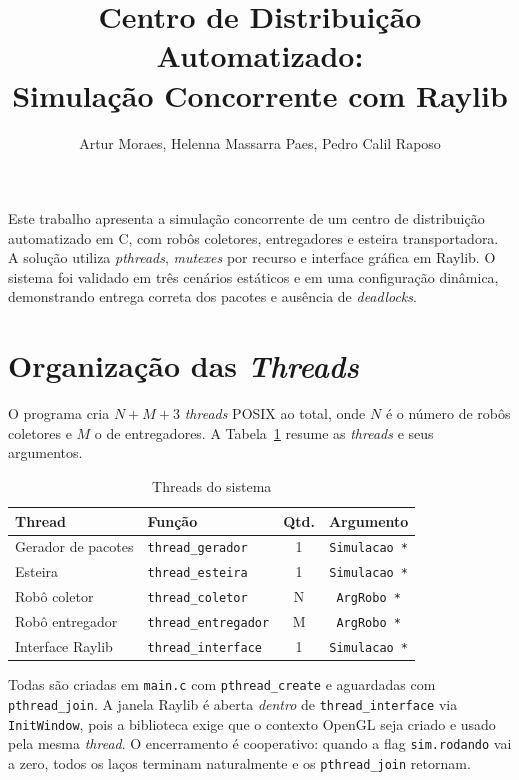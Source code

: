 \documentclass[12pt]{article}
\title{Centro de Distribuição Automatizado:\\
       Simulação Concorrente com Raylib}
\author{Artur Moraes, Helenna Massarra Paes, Pedro Calil Raposo}
\begin{document}
\maketitle

\begin{resumo}
Este trabalho apresenta a simulação concorrente de um centro de distribuição
automatizado em C, com robôs coletores, entregadores e esteira transportadora.
A solução utiliza \textit{pthreads}, \textit{mutexes} por recurso e interface
gráfica em Raylib. O sistema foi validado em três cenários estáticos e em uma
configuração dinâmica, demonstrando entrega correta dos pacotes e ausência de
\textit{deadlocks}.
\end{resumo}

\section{Organização das \textit{Threads}}
\label{sec:threads}

O programa cria $N + M + 3$ \textit{threads} POSIX \cite{posix:18} ao total,
onde $N$ é o número de robôs coletores e $M$ o de entregadores.  A Tabela~\ref{tab:threads} resume as
\textit{threads} e seus argumentos.

\begin{table}[h]
\centering
\caption{Threads do sistema}
\label{tab:threads}
\small
\begin{tabular}{llcc}
\toprule
\textbf{Thread}       & \textbf{Função}       & \textbf{Qtd.} & \textbf{Argumento}         \\
\midrule
Gerador de pacotes    & \texttt{thread\_gerador}    & 1 & \texttt{Simulacao *}       \\
Esteira               & \texttt{thread\_esteira}    & 1 & \texttt{Simulacao *}       \\
Robô coletor          & \texttt{thread\_coletor}    & N & \texttt{ArgRobo *}         \\
Robô entregador       & \texttt{thread\_entregador} & M & \texttt{ArgRobo *}         \\
Interface Raylib      & \texttt{thread\_interface}  & 1 & \texttt{Simulacao *}       \\
\bottomrule
\end{tabular}
\end{table}

Todas são criadas em \texttt{main.c} com \texttt{pthread\_create} e aguardadas
com \texttt{pthread\_join}.  A janela Raylib é aberta \emph{dentro} de
\texttt{thread\_interface} via \texttt{InitWindow}, pois a biblioteca exige
que o contexto OpenGL seja criado e usado pela mesma \textit{thread}.  O
encerramento é cooperativo: quando a flag \texttt{sim.rodando} vai a zero,
todos os laços terminam naturalmente e os \texttt{pthread\_join} retornam.
\end{document}
